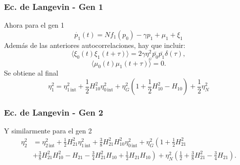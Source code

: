 \documentclass{beamer}
\begin{document}
\begin{frame}
\frametitle{Ec. de Langevin - Gen 1}
Ahora para el gen 1
$$\dot{p_1}(t) = Nf_1(p_{0}) - \gamma p_1 + \mu_1 + \xi_1$$
Adem\'as de las anteriores autocorrelaciones, hay que incluir:
$$\langle \xi_0(t)\xi_1(t+\tau) \rangle = 2 \gamma \eta_{_G}^2\bar{p_0}\bar{p_1}\delta(\tau),$$
$$\langle \mu_0(t)\mu_1(t+\tau) \rangle =0.$$
Se obtiene al final
$$\eta_1^2 = \eta_{1\,\text{int}}^2 + \frac{1}{2} H_{10}^2 \eta_{0\,\text{int}}^2 + \eta_G^2\left( 1 + \frac{1}{2} H_{10}^2 - H_{10} \right) + \frac{1}{2} \eta_N^2 $$
\end{frame}

\begin{frame}
\frametitle{Ec. de Langevin - Gen 2}
Y similarmente para el gen 2
\begin{align*}
\eta_2^2 &= \eta_{2\,\text{int}}^2 + \frac{1}{2} H_{21}^2 \eta_{1\,\text{int}}^2 + \frac{3}{8}H_{21}^2H_{10}^2\eta_{0\,\text{int}}^2 + \eta_G^2 \left(1 + \frac{1}{2} H_{21}^2\right.\\
&\left.+ \frac{3}{8} H_{21}^2H_{10}^2 - H_{21} - \frac{3}{4}H_{21}^2H_{10} + \frac{1}{2} H_{21}H_{10} \right) + \eta_N^2 \left( \frac{1}{2} + \frac{3}{8}H_{21}^2-\frac{3}{4}H_{21}\right).
\end{align*}
\end{frame}




\end{document}
